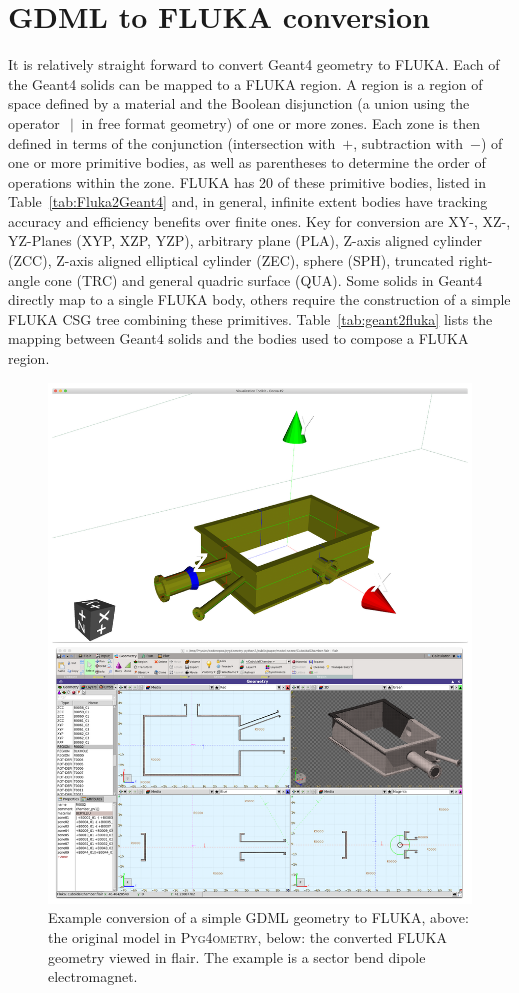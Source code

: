 \documentclass[final,5p,times,twocolumn]{elsarticle}
\newcommand{\PYGEOMETRY}{\textsc{Pyg4ometry}}
\begin{document}
\section{GDML to FLUKA conversion}
It is relatively straight forward to convert Geant4 geometry to FLUKA. Each
of the Geant4 solids can be mapped to a FLUKA region.  A region is a region
of space defined by a material and the Boolean disjunction (a union using
the operator~$\:|\:$ in free format geometry) of one or more
zones. Each zone is then defined in terms of the conjunction (intersection
with~$+$, subtraction with~$-$) of one or more primitive bodies, as well as
parentheses to determine the order of operations within the zone.  FLUKA
has 20 of these primitive bodies, listed in Table~\ref{tab:Fluka2Geant4}
and, in general, infinite extent bodies have tracking accuracy and
efficiency benefits over finite ones. Key for conversion are XY-, XZ-,
YZ-Planes (XYP, XZP, YZP), arbitrary plane (PLA), Z-axis aligned cylinder
(ZCC), Z-axis aligned elliptical cylinder (ZEC), sphere (SPH), truncated
right-angle cone (TRC) and general quadric surface (QUA). Some solids in
Geant4 directly map to a single FLUKA body, others require the construction
of a simple FLUKA CSG tree combining these
primitives. Table~\ref{tab:geant2fluka} lists the mapping between Geant4
solids and the bodies used to compose a FLUKA region.
\begin{figure}
\begin{center}
\includegraphics[width=0.9\columnwidth]{./model-scene/CuboidalChamber.pdf}
\caption{Example conversion of a simple GDML geometry to FLUKA, above:
the original model in \PYGEOMETRY{}, below: the converted FLUKA geometry
viewed in flair. The example is a sector bend dipole electromagnet.}
\label{fig:gdml-flair}
\end{center}
\end{figure}
\end{document}
